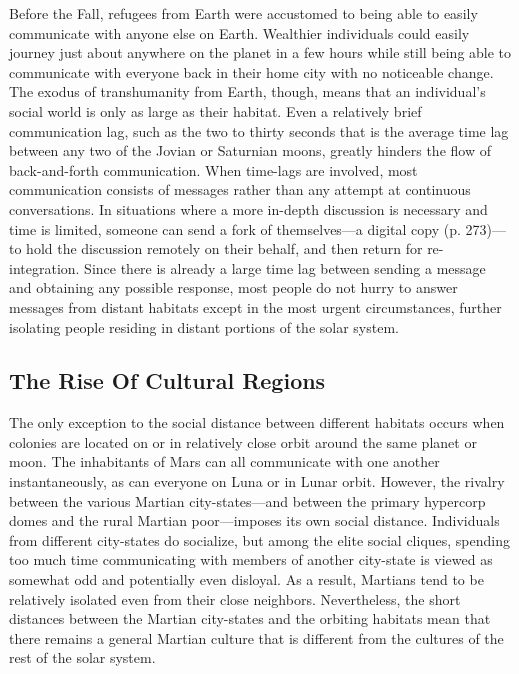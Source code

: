 Before the Fall, refugees from Earth were accustomed
to being able to easily communicate with
anyone else on Earth. Wealthier individuals could 
easily journey just about anywhere on the planet in a 
few hours while still being able to communicate with 
everyone back in their home city with no noticeable 
change. The exodus of transhumanity from Earth, 
though, means that an individual's social world is 
only as large as their habitat. Even a relatively brief 
communication lag, such as the two to thirty seconds 
that is the average time lag between any two of the 
Jovian or Saturnian moons, greatly hinders the flow of 
back-and-forth communication. When time-lags are 
involved, most communication consists of messages 
rather than any attempt at continuous conversations. 
In situations where a more in-depth discussion is necessary
and time is limited, someone can send a fork
of themselves—a digital copy (p. 273)—to hold the 
discussion remotely on their behalf, and then return 
for re-integration. Since there is already a large time 
lag between sending a message and obtaining any possible
response, most people do not hurry to answer
messages from distant habitats except in the most 
urgent circumstances, further isolating people residing 
in distant portions of the solar system.

\subsection{The Rise Of Cultural Regions}

The only exception to the social distance between different
habitats occurs when colonies are located on
or in relatively close orbit around the same planet or 
moon. The inhabitants of Mars can all communicate 
with one another instantaneously, as can everyone 
on Luna or in Lunar orbit. However, the rivalry between
the various Martian city-states—and between
the primary hypercorp domes and the rural Martian 
poor—imposes its own social distance. Individuals 
from different city-states do socialize, but among the 
elite social cliques, spending too much time communicating
with members of another city-state is viewed
as somewhat odd and potentially even disloyal. As 
a result, Martians tend to be relatively isolated even 
from their close neighbors. Nevertheless, the short 
distances between the Martian city-states and the 
orbiting habitats mean that there remains a general 
Martian culture that is different from the cultures of 
the rest of the solar system.

